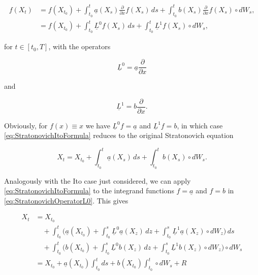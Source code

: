 \begin{equation} \label{eq:StratonovichItoFormula}
\begin{split}
    f(X_t) &= f(X_{t_0}) + \int_{t_0}^t \underline{a}(X_s)\frac{\partial}{\partial x}f(X_s) \, ds+ \int_{t_0}^t b(X_s)\frac{\partial}{\partial x}f(X_s) \circ dW_s, \\
    &= f(X_{t_0}) + \int_{t_0}^t \underline{L}^0 f(X_s) \, ds + \int_{t_0}^t \underline{L}^1 f(X_s) \circ dW_s,
\end{split}
\end{equation}

\noindent for \(t \in [t_0, T]\), with the operators

\begin{equation} \label{eq:StratonovichOperatorL0}
    \underline{L}^0 = \underline{a} \frac{\partial}{\partial x}
\end{equation}

\noindent and

\begin{equation} \label{eq:StratonovichOperatorL1}
    \underline{L}^1 = b \frac{\partial}{\partial x}.
\end{equation}

\noindent Obviously, for \(f(x) \equiv x\) we have \(\underline{L}^0 f = \underline{a}\) and \(\underline{L}^1 f = b\), in which case \eqref{eq:StratonovichItoFormula} reduces to the original Stratonovich equation

\begin{equation} \label{eq:StratonovichIdentity}
    X_t = X_{t_0} + \int_{t_0}^t \underline{a}(X_s) \, ds + \int_{t_0}^t b(X_s) \circ dW_s.
\end{equation}

\noindent Analogously with the Ito case just considered, we can apply \eqref{eq:StratonovichItoFormula} to the integrand functions \(f = \underline{a}\) and \(f = b\) in \eqref{eq:StratonovichOperatorL0}. This gives

\begin{equation} \label{eq:StratonovichCoefficientExpansion}
\begin{split}
    X_t &= X_{t_0} \\
    &\quad + \int_{t_0}^t \biggl( \underline{a}(X_{t_0}) + \int_{t_0}^s \underline{L}^0 \underline{a}(X_z) \, dz + \int_{t_0}^s \underline{L}^1 \underline{a}(X_z) \circ dW_z \biggr) \, ds \\
    &\quad + \int_{t_0}^t \biggl( b(X_{t_0}) + \int_{t_0}^s \underline{L}^0 b(X_z) \, dz + \int_{t_0}^s \underline{L}^1 b(X_z) \circ dW_z \biggr) \circ dW_s \\
    &= X_{t_0} + \underline{a}(X_{t_0}) \int_{t_0}^t ds + b(X_{t_0}) \int_{t_0}^t \circ dW_s + R
\end{split}
\end{equation}

